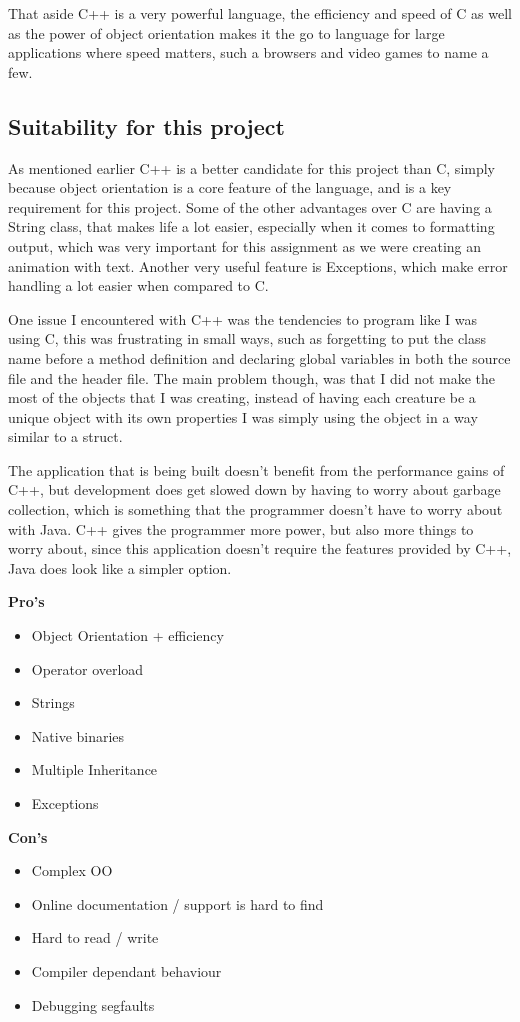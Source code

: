 \documentclass[10pt]{article}
\begin{document}
  That aside C++ is a very powerful language, the efficiency and speed of C as well as the power of object orientation makes it the go to language for large applications where speed matters, such a browsers and video games to name a few. 

  \subsection{Suitability for this project}
  As mentioned earlier C++ is a better candidate for this project than C, simply because object orientation is a core feature of the language, and is a key requirement for this project. Some of the other advantages over C are having a String class, that makes life a lot easier, especially when it comes to formatting output, which was very important for this assignment as we were creating an animation with text. Another very useful feature is Exceptions, which make error handling a lot easier when compared to C.
  
  One issue I encountered with C++ was the tendencies to program like I was using C, this was frustrating in small ways, such as forgetting to put the class name before a method definition and declaring global variables in both the source file and the header file. The main problem though, was that I did not make the most of the objects that I was creating, instead of having each creature be a unique object with its own properties I was simply using the object in a way similar to a struct. 
  
  The application that is being built doesn't benefit from the performance gains of C++, but development does get slowed down by having to worry about garbage collection, which is something that the programmer doesn't have to worry about with Java. C++ gives the programmer more power, but also more things to worry about, since this application doesn't require the features provided by C++, Java does look like a simpler option. 


  \begin{multicols}{2}
  \textbf{Pro's}
  \begin{itemize}
    \item Object Orientation + efficiency 
    \item Operator overload
    \item Strings
    \item Native binaries
    \item Multiple Inheritance
    \item Exceptions
  \end{itemize}

  \textbf{Con's}
  \begin{itemize}
    \item Complex OO
    \item Online documentation / support is hard to find
    \item Hard to read / write
    \item Compiler dependant behaviour
    \item Debugging segfaults
  \end{itemize}
\end{multicols}
\end{document}
